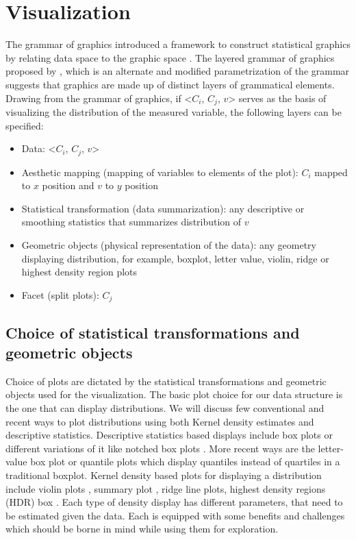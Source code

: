 \documentclass[12pt]{article}
\providecommand{\tightlist}{%
  \setlength{\itemsep}{0pt}\setlength{\parskip}{0pt}}
\begin{document}
\hypertarget{sec:visualization}{%
\section{Visualization}\label{sec:visualization}}

The grammar of graphics introduced a framework to construct statistical graphics by relating data space to the graphic space \citep{Wilkinson1999-nk}. The layered grammar of graphics proposed by \citet{Wickham2009pk}, which is an alternate and modified parametrization of the grammar suggests that graphics are made up of distinct layers of grammatical elements. Drawing from the grammar of graphics, if \textless{}\(C_i\), \(C_j\), \(v\)\textgreater{} serves as the basis of visualizing the distribution of the measured variable, the following layers can be specified:

\begin{itemize}
\tightlist
\item
  Data: \textless{}\(C_i\), \(C_j\), \(v\)\textgreater{}
\item
  Aesthetic mapping (mapping of variables to elements of the plot): \(C_i\) mapped to \(x\) position and \(v\) to \(y\) position
\item
  Statistical transformation (data summarization): any descriptive or smoothing statistics that summarizes distribution of \(v\)
\item
  Geometric objects (physical representation of the data): any geometry displaying distribution, for example, boxplot, letter value, violin, ridge or highest density region plots
\item
  Facet (split plots): \(C_j\)
\end{itemize}

\hypertarget{choice-of-statistical-transformations-and-geometric-objects}{%
\subsection{Choice of statistical transformations and geometric objects}\label{choice-of-statistical-transformations-and-geometric-objects}}

Choice of plots are dictated by the statistical transformations and geometric objects used for the visualization. The basic plot choice for our data structure is the one that can display distributions. We will discuss few conventional and recent ways to plot distributions using both Kernel density estimates and descriptive statistics. Descriptive statistics based displays include box plots \citep{Tukey1977-jx} or different variations of it like notched box plots \citep{Mcgill1978-hg}. More recent ways are the letter-value box plot \citep{Hofmann2017-sg} or quantile plots which display quantiles instead of quartiles in a traditional boxplot. Kernel density based plots for displaying a distribution include violin plots \citep{Hintze1998-zi}, summary plot \citep{Potter2010-qc}, ridge line plots, highest density regions (HDR) box \citep{Hyndman1996-ft}. Each type of density display has different parameters, that need to be estimated given the data. Each is equipped with some benefits and challenges which should be borne in mind while using them for exploration.
\end{document}
